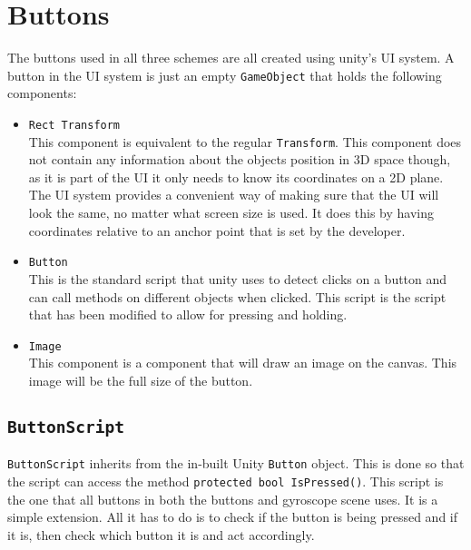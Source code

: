 \section{Buttons}
The buttons used in all three schemes are all created using unity's UI system. A button in the UI system is just an empty {\tt GameObject} that holds the following components:
\begin{itemize}
\item {\tt Rect Transform}\\
This component is equivalent to the regular {\tt Transform}. This component does not contain any information about the objects position in 3D space though, as it is part of the UI it only needs to know its coordinates on a 2D plane. The UI system provides a convenient way of making sure that the UI will look the same, no matter what screen size is used. It does this by having coordinates relative to an anchor point that is set by the developer. 
\item {\tt Button}\\
This is the standard script that unity uses to detect clicks on a button and can call methods on different objects when clicked. This script is the script that has been modified to allow for pressing and holding.
\item {\tt Image} \\
This component is a component that will draw an image on the canvas. This image will be the full size of the button.
\end{itemize}

\subsection{{\tt ButtonScript}}
{\tt ButtonScript} inherits from the in-built Unity {\tt Button} object. This is done so that the script can access the method {\tt   protected bool IsPressed()}. This script is the one that all buttons in both the buttons and gyroscope scene uses. It is a simple extension. All it has to do is to check if the button is being pressed and if it is, then check which button it is and act accordingly. 
